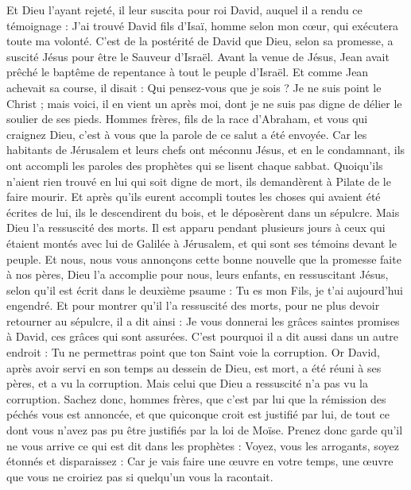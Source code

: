 \begin{multicols}{2}
Et Dieu l'ayant rejeté, il leur suscita pour roi David, auquel il a rendu ce témoignage : J’ai trouvé David fils d’Isaï, homme selon mon cœur, qui exécutera toute ma volonté.
C’est de la postérité de David que Dieu, selon sa promesse, a suscité Jésus pour être le Sauveur d’Israël.
Avant la venue de Jésus, Jean avait prêché le baptême de repentance à tout le peuple d'Israël.
Et comme Jean achevait sa course, il disait : Qui pensez-vous que je sois ? Je ne suis point le Christ ; mais voici, il en vient un après moi, dont je ne suis pas digne de délier le soulier de ses pieds.
Hommes frères, fils de la race d'Abraham, et vous qui craignez Dieu, c'est à vous que la parole de ce salut a été envoyée.
Car les habitants de Jérusalem et leurs chefs ont méconnu Jésus, et en le condamnant, ils ont accompli les paroles des prophètes qui se lisent chaque sabbat.
Quoiqu'ils n’aient rien trouvé en lui qui soit digne de mort, ils demandèrent à Pilate de le faire mourir.
Et après qu'ils eurent accompli toutes les choses qui avaient été écrites de lui, ils le descendirent du bois, et le déposèrent dans un sépulcre.
Mais Dieu l'a ressuscité des morts.
Il est apparu pendant plusieurs jours à ceux qui étaient montés avec lui de Galilée à Jérusalem, et qui sont ses témoins devant le peuple.
Et nous, nous vous annonçons cette bonne nouvelle que la promesse faite à nos pères,
Dieu l'a accomplie pour nous, leurs enfants, en ressuscitant Jésus, selon qu'il est écrit dans le deuxième psaume : Tu es mon Fils, je t'ai aujourd'hui engendré.
Et pour montrer qu'il l'a ressuscité des morts, pour ne plus devoir retourner au sépulcre, il a dit ainsi : Je vous donnerai les grâces saintes promises à David, ces grâces qui sont assurées.
C'est pourquoi il a dit aussi dans un autre endroit : Tu ne permettras point que ton Saint voie la corruption.
Or David, après avoir servi en son temps au dessein de Dieu, est mort, a été réuni à ses pères, et a vu la corruption.
Mais celui que Dieu a ressuscité n'a pas vu la corruption.
Sachez donc, hommes frères, que c'est par lui que la rémission des péchés vous est annoncée,
et que quiconque croit est justifié par lui, de tout ce dont vous n'avez pas pu être justifiés par la loi de Moïse.
Prenez donc garde qu'il ne vous arrive ce qui est dit dans les prophètes :
Voyez, vous les arrogants, soyez étonnés et disparaissez : Car je vais faire une œuvre en votre temps, une œuvre que vous ne croiriez pas si quelqu'un vous la racontait.

\end{multicols}

